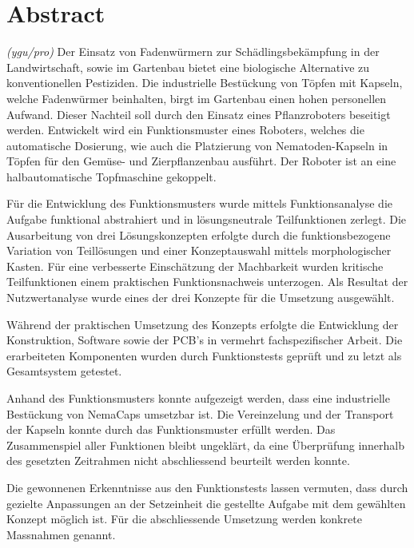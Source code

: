 \newpage
\section{Abstract}
\textit{(ygu/pro)} Der Einsatz von Fadenwürmern zur Schädlingsbekämpfung in der Landwirtschaft, sowie im Gartenbau bietet eine biologische Alternative zu konventionellen Pestiziden. Die industrielle Bestückung von Töpfen mit Kapseln, welche Fadenwürmer beinhalten, birgt im Gartenbau einen hohen personellen Aufwand. Dieser Nachteil soll durch den Einsatz eines Pflanzroboters beseitigt werden. Entwickelt wird ein Funktionsmuster eines Roboters, welches die automatische Dosierung, wie auch die Platzierung von Nematoden-Kapseln in Töpfen für den Gemüse- und Zierpflanzenbau ausführt. Der Roboter ist an eine halbautomatische Topfmaschine gekoppelt.
\newline

Für die Entwicklung des Funktionsmusters wurde mittels Funktionsanalyse die Aufgabe funktional abstrahiert und in lösungsneutrale Teilfunktionen zerlegt. Die Ausarbeitung von drei Lösungskonzepten erfolgte durch die funktionsbezogene Variation von Teillösungen und einer Konzeptauswahl mittels morphologischer Kasten. Für eine verbesserte Einschätzung der Machbarkeit wurden kritische Teilfunktionen einem praktischen Funktionsnachweis unterzogen. Als Resultat der Nutzwertanalyse wurde eines der drei Konzepte für die Umsetzung ausgewählt.
\newline

Während der praktischen Umsetzung des Konzepts erfolgte die Entwicklung der Konstruktion, Software sowie der PCB’s in vermehrt fachspezifischer Arbeit. Die erarbeiteten Komponenten wurden durch Funktionstests geprüft und zu letzt als Gesamtsystem getestet.
\newline

Anhand des Funktionsmusters konnte aufgezeigt werden, dass eine industrielle Bestückung von NemaCaps umsetzbar ist. Die Vereinzelung und der Transport der Kapseln konnte durch das Funktionsmuster erfüllt werden. Das Zusammenspiel aller Funktionen bleibt ungeklärt, da eine Überprüfung innerhalb des gesetzten Zeitrahmen nicht abschliessend beurteilt werden konnte. 
\newline

Die gewonnenen Erkenntnisse aus den Funktionstests lassen vermuten, dass durch gezielte Anpassungen an der Setzeinheit die gestellte Aufgabe mit dem gewählten Konzept möglich ist. Für die abschliessende Umsetzung werden konkrete Massnahmen genannt.

